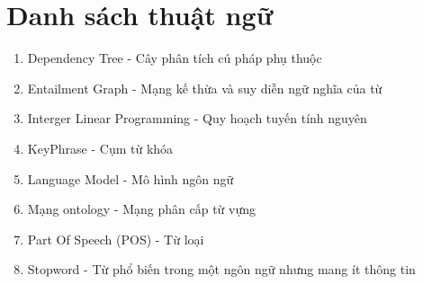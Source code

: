 \chapter*{Danh sách thuật ngữ}
\label{Appendix:Terminologies}

\begin{enumerate}
\item Dependency Tree - Cây phân tích cú pháp phụ thuộc
\item Entailment Graph - Mạng kế thừa và suy diễn ngữ nghĩa của từ
\item Interger Linear Programming - Quy hoạch tuyến tính nguyên
\item KeyPhrase - Cụm từ khóa
\item Language Model - Mô hình ngôn ngữ
\item Mạng ontology - Mạng phân cấp từ vựng
\item Part Of Speech (POS) - Từ loại
\item Stopword - Từ phổ biến trong một ngôn ngữ nhưng mang ít thông tin
\end{enumerate}